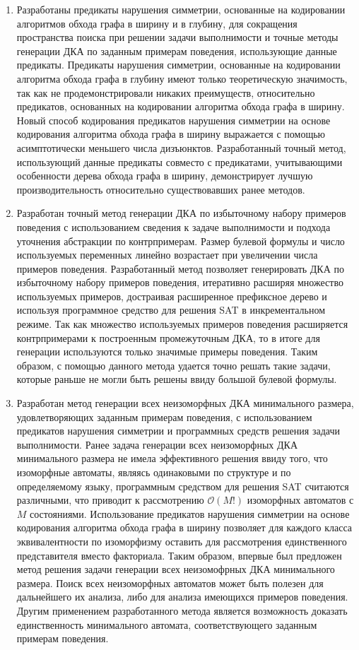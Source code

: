 \begin{enumerate}
  \item Разработаны предикаты нарушения симметрии, основанные на кодировании алгоритмов обхода графа в ширину и в глубину, для сокращения пространства поиска при решении задачи выполнимости и точные методы генерации ДКА по заданным примерам поведения, использующие данные предикаты. 
  Предикаты нарушения симметрии, основанные на кодировании алгоритма обхода графа в глубину имеют только теоретическую значимость, так как не продемонстрировали никаких преимуществ, относительно предикатов, основанных на кодировании алгоритма обхода графа в ширину.
  Новый способ кодирования предикатов нарушения симметрии на основе кодирования алгоритма обхода графа в ширину выражается с помощью асимптотически меньшего числа дизъюнктов.
  Разработанный точный метод, использующий данные предикаты совместо с предикатами, учитывающими особенности дерева обхода графа в ширину, демонстрирует лучшую производительность относительно существовавших ранее методов.

  \item Разработан точный метод генерации ДКА по избыточному набору примеров поведения с использованием сведения к задаче выполнимости и подхода уточнения абстракции по контрпримерам.
  Размер булевой формулы и число используемых переменных линейно возрастает при увеличении числа примеров поведения.
  Разработанный метод позволяет генерировать ДКА по избыточному набору примеров поведения, итеративно расширяя множество используемых примеров, достраивая расширенное префиксное дерево и используя программное средство для решения SAT в инкрементальном режиме.
  Так как множество используемых примеров поведения расширяется контрпримерами к построенным промежуточным ДКА, то в итоге для генерации используются только значимые примеры поведения.
  Таким образом, с помощью данного метода удается точно решать такие задачи, которые раньше не могли быть решены ввиду большой булевой формулы.

  \item Разработан метод генерации всех неизоморфных ДКА минимального размера, удовлетворяющих заданным примерам поведения, с использованием предикатов нарушения симметрии и программных средств решения задачи выполнимости.
  Ранее задача генерации всех неизоморфных ДКА минимального размера не имела эффективного решения ввиду того, что изоморфные автоматы, являясь одинаковыми по структуре и по определяемому языку, программным средством для решения SAT считаются различными, что приводит к рассмотрению $\mathcal{O}\left(M!\right)$ изоморфных автоматов с $M$ состояниями.
  Использование предикатов нарушения симметрии на основе кодирования алгоритма обхода графа в ширину позволяет для каждого класса эквивалентности по изоморфизму оставить для рассмотрения единственного представителя вместо факториала. 
  Таким образом, впервые был предложен метод решения задачи генерации всех неизомофрных ДКА минимального размера.
  Поиск всех неизоморфных автоматов может быть полезен для дальнейшего их анализа, либо для анализа имеющихся примеров поведения.
  Другим применением разработанного метода является возможность доказать единственность минимального автомата, соответствующего заданным примерам поведения.

 \end{enumerate}

